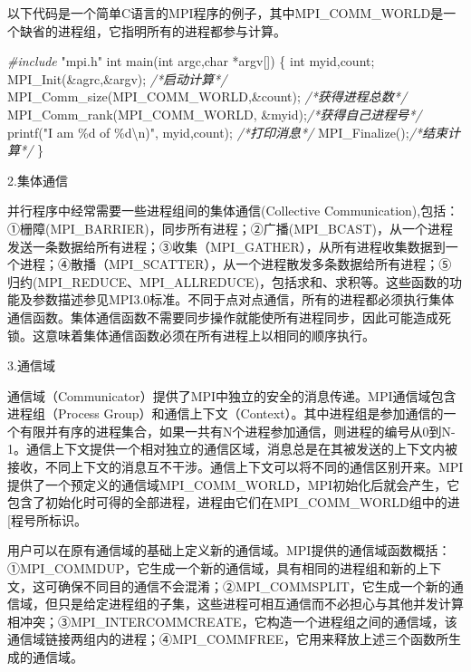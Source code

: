 \documentclass[]{ctexbook}
\newenvironment{Shaded}{\begin{snugshade}}{\end{snugshade}}
\newcommand{\CommentTok}[1]{\textcolor[rgb]{0.56,0.35,0.01}{\textit{#1}}}
\newcommand{\DataTypeTok}[1]{\textcolor[rgb]{0.13,0.29,0.53}{#1}}
\newcommand{\ImportTok}[1]{#1}
\newcommand{\NormalTok}[1]{#1}
\newcommand{\PreprocessorTok}[1]{\textcolor[rgb]{0.56,0.35,0.01}{\textit{#1}}}
\newcommand{\SpecialCharTok}[1]{\textcolor[rgb]{0.00,0.00,0.00}{#1}}
\newcommand{\StringTok}[1]{\textcolor[rgb]{0.31,0.60,0.02}{#1}}
\begin{document}
以下代码是一个简单C语言的MPI程序的例子，其中MPI\_COMM\_WORLD是一个缺省的进程组，它指明所有的进程都参与计算。

\begin{Shaded}
\begin{Highlighting}[]
\PreprocessorTok{\#include }\ImportTok{"mpi.h"}
\DataTypeTok{int}\NormalTok{ main(}\DataTypeTok{int}\NormalTok{ argc,}\DataTypeTok{char}\NormalTok{ *argv[])}
\NormalTok{\{  }\DataTypeTok{int}\NormalTok{ myid,count;}
\NormalTok{   MPI\_Init(\&agrc,\&argv); }\CommentTok{/*启动计算*/}
\NormalTok{   MPI\_Comm\_size(MPI\_COMM\_WORLD,\&count); }\CommentTok{/*获得进程总数*/}
\NormalTok{   MPI\_Comm\_rank(MPI\_COMM\_WORLD, \&myid);}\CommentTok{/*获得自己进程号*/}
\NormalTok{   printf(}\StringTok{"I am \%d of \%d}\SpecialCharTok{\textbackslash{}n}\StringTok{)"}\NormalTok{, myid,count);  }\CommentTok{/*打印消息*/}
\NormalTok{   MPI\_Finalize();}\CommentTok{/*结束计算*/}
\NormalTok{\}}
\end{Highlighting}
\end{Shaded}

2.集体通信

并行程序中经常需要一些进程组间的集体通信(Collective Communication),包括：①栅障(MPI\_BARRIER)，同步所有进程；②广播(MPI\_BCAST)，从一个进程发送一条数据给所有进程；③收集（MPI\_GATHER），从所有进程收集数据到一个进程；④散播（MPI\_SCATTER），从一个进程散发多条数据给所有进程；⑤归约(MPI\_REDUCE、MPI\_ALLREDUCE)，包括求和、求积等。这些函数的功能及参数描述参见MPI3.0标准。不同于点对点通信，所有的进程都必须执行集体通信函数。集体通信函数不需要同步操作就能使所有进程同步，因此可能造成死锁。这意味着集体通信函数必须在所有进程上以相同的顺序执行。

3.通信域

通信域（Communicator）提供了MPI中独立的安全的消息传递。MPI通信域包含进程组（Process Group）和通信上下文（Context）。其中进程组是参加通信的一个有限并有序的进程集合，如果一共有N个进程参加通信，则进程的编号从0到N-1。通信上下文提供一个相对独立的通信区域，消息总是在其被发送的上下文内被接收，不同上下文的消息互不干涉。通信上下文可以将不同的通信区别开来。MPI提供了一个预定义的通信域MPI\_COMM\_WORLD，MPI初始化后就会产生，它包含了初始化时可得的全部进程，进程由它们在MPI\_COMM\_WORLD组中的进{[}程号所标识。

用户可以在原有通信域的基础上定义新的通信域。MPI提供的通信域函数概括：①MPI\_COMMDUP，它生成一个新的通信域，具有相同的进程组和新的上下文，这可确保不同目的通信不会混淆；②MPI\_COMMSPLIT，它生成一个新的通信域，但只是给定进程组的子集，这些进程可相互通信而不必担心与其他并发计算相冲突；③MPI\_INTERCOMMCREATE，它构造一个进程组之间的通信域，该通信域链接两组内的进程；④MPI\_COMMFREE，它用来释放上述三个函数所生成的通信域。
\end{document}
